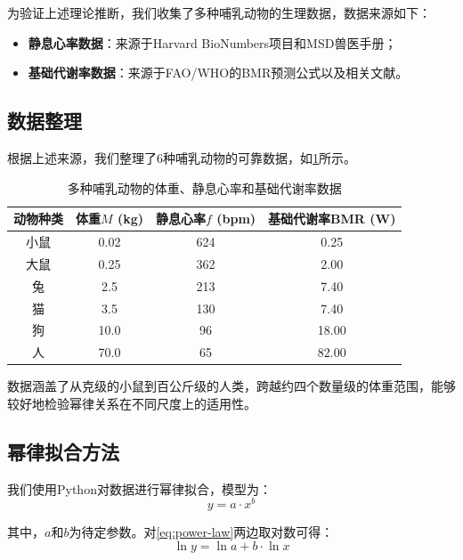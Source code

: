 为验证上述理论推断，我们收集了多种哺乳动物的生理数据，数据来源如下：
\begin{itemize}
    \item \textbf{静息心率数据}：来源于Harvard BioNumbers项目和MSD兽医手册；
    \item \textbf{基础代谢率数据}：来源于FAO/WHO的BMR预测公式以及相关文献。
\end{itemize}

\subsection{数据整理}

根据上述来源，我们整理了6种哺乳动物的可靠数据，如\cref{tab:animal-data}所示。

\begin{table}[H]
\caption{多种哺乳动物的体重、静息心率和基础代谢率数据}
\label{tab:animal-data}
\centering
\begin{tabular}{cccc}
\toprule[1.5pt]
动物种类 & 体重$M$ (kg) & 静息心率$f$ (bpm) & 基础代谢率BMR (W) \\
\midrule[1pt]
小鼠 & 0.02 & 624 & 0.25 \\
大鼠 & 0.25 & 362 & 2.00 \\
兔 & 2.5 & 213 & 7.40 \\
猫 & 3.5 & 130 & 7.40 \\
狗 & 10.0 & 96 & 18.00 \\
人 & 70.0 & 65 & 82.00 \\
\bottomrule[1.5pt]
\end{tabular}
\end{table}

数据涵盖了从克级的小鼠到百公斤级的人类，跨越约四个数量级的体重范围，能够较好地检验幂律关系在不同尺度上的适用性。

\subsection{幂律拟合方法}

我们使用Python对数据进行幂律拟合，模型为：
\begin{equation}
y = a \cdot x^b
\label{eq:power-law}
\end{equation}

其中，$a$和$b$为待定参数。对\cref{eq:power-law}两边取对数可得：
\begin{equation}
\ln y = \ln a + b \cdot \ln x
\end{equation}


